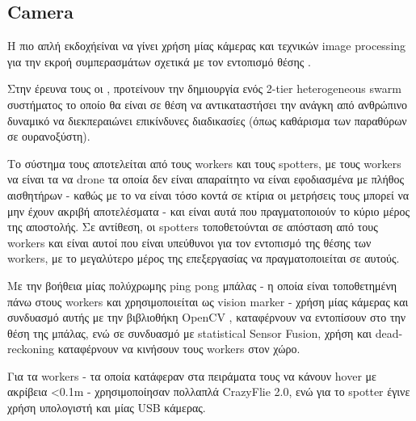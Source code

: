 \subsection{Camera} \label{sec:related-camera}
H πιο απλή εκδοχή\udot είναι να γίνει χρήση μίας κάμερας και τεχνικών image processing για την εκροή συμπερασμάτων σχετικά με τον εντοπισμό θέσης .

Στην έρευνα τους οι \cite{related-simple-camera}, προτείνουν την δημιουργία ενός 2-tier heterogeneous  swarm συστήματος το οποίο θα είναι σε θέση να αντικαταστήσει την ανάγκη από ανθρώπινο δυναμικό να διεκπεραιώνει επικίνδυνες διαδικασίες (όπως καθάρισμα των παραθύρων σε ουρανοξύστη).

Το σύστημα τους αποτελείται από τους workers και τους spotters, με τους workers να είναι τα να drone τα οποία δεν είναι απαραίτητο να είναι εφοδιασμένα με πλήθος αισθητήρων - καθώς με το να είναι τόσο κοντά σε κτίρια οι μετρήσεις τους μπορεί να μην έχουν ακριβή αποτελέσματα - και είναι αυτά που πραγματοποιούν το κύριο μέρος της αποστολής. Σε αντίθεση, οι spotters τοποθετούνται σε απόσταση από τους workers και είναι αυτοί που είναι υπεύθυνοι για τον εντοπισμό της θέσης των workers, με το μεγαλύτερο μέρος της επεξεργασίας να πραγματοποιείται σε αυτούς.

Με την βοήθεια μίας πολύχρωμης ping pong μπάλας - η οποία είναι τοποθετημένη πάνω στους workers και χρησιμοποιείται ως vision marker - χρήση μίας κάμερας και συνδυασμό αυτής με την βιβλιοθήκη OpenCV \cite{opencv}, καταφέρνουν να εντοπίσουν στο  την θέση της μπάλας, ενώ σε συνδυασμό με statistical Sensor Fusion, χρήση  και dead-reckoning καταφέρνουν να κινήσουν τους workers στον χώρο.

Για τα workers - τα οποία κατάφεραν στα πειράματα τους να κάνουν hover με ακρίβεια <0.1m - χρησιμοποίησαν πολλαπλά CrazyFlie 2.0, ενώ για το spotter έγινε χρήση υπολογιστή και μίας USB κάμερας.

